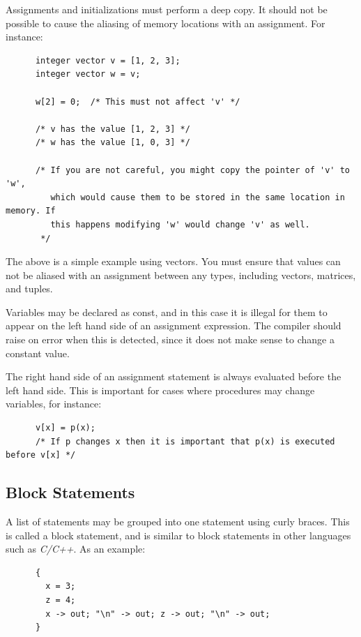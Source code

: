 \documentclass{article}
\begin{document}
    Assignments and initializations must perform a deep copy. It should not be possible to cause the aliasing of
    memory locations with an assignment. For instance:

    \begin{lstlisting}
      integer vector v = [1, 2, 3];
      integer vector w = v;

      w[2] = 0;  /* This must not affect 'v' */

      /* v has the value [1, 2, 3] */
      /* w has the value [1, 0, 3] */

      /* If you are not careful, you might copy the pointer of 'v' to 'w',
         which would cause them to be stored in the same location in memory. If
         this happens modifying 'w' would change 'v' as well.
       */
    \end{lstlisting}

    The above is a simple example using vectors. You must ensure that values can not be aliased with an assignment
    between any types, including vectors, matrices, and tuples.

    Variables may be declared as const, and in this case it is illegal for them to appear on the left hand side of
    an assignment expression. The compiler should raise on error when this is detected, since it does not make sense
    to change a constant value.

    The right hand side of an assignment statement is always evaluated before the left hand side. This is important
    for cases where procedures may change variables, for instance:

    \begin{lstlisting}
      v[x] = p(x);
      /* If p changes x then it is important that p(x) is executed before v[x] */
    \end{lstlisting}

  \subsection{Block Statements}\label{sec:block}

    A list of statements may be grouped into one statement using curly braces. This is called a block statement, and
    is similar to block statements in other languages such as \textit{C/C++}. As an example:

    \begin{lstlisting}
      {
        x = 3;
        z = 4;
        x -> out; "\n" -> out; z -> out; "\n" -> out;
      }
    \end{lstlisting}
\end{document}
